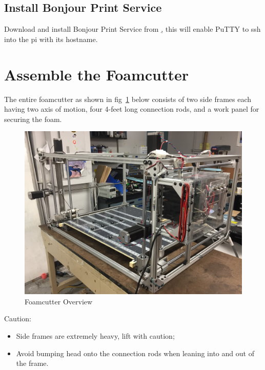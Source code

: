 \documentclass[titlepage,12pt,letter]{report}
\numberwithin{equation}{chapter}
\begin{document}
\subsection{Install Bonjour Print Service}
Download and install Bonjour Print Service from \href{https://support.apple.com/kb/DL999?locale=en_US}, this will enable PuTTY to ssh into the pi with its hostname. 

\newpage



\section{Assemble the Foamcutter}
\label{sec:assemble}

The entire foamcutter as shown in fig~\ref{fig:overview} below consists of two side frames each having two axis of motion, four 4-feet long connection rods, and a work panel for securing the foam. 

\begin{figure} [H]
	\includegraphics[width = 0.9\linewidth]{./Figures/overview.jpg}
	\caption{Foamcutter Overview}
	\label{fig:overview}
\end{figure}

\begin{tcolorbox}
	{\large
		\noindent Caution:
		\begin{itemize}[noitemsep,topsep=0pt]
			\item Side frames are extremely heavy, lift with caution;
			\item Avoid bumping head onto the connection rods when leaning into and out of the frame.
		\end{itemize}
	}
\end{tcolorbox}
\end{document}
